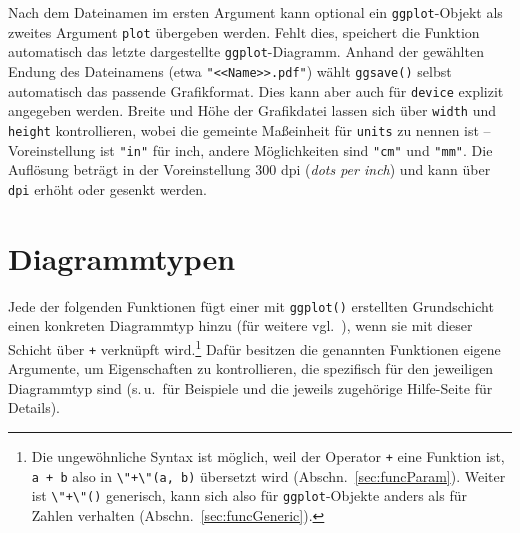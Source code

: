 Nach dem Dateinamen im ersten Argument kann optional ein \lstinline!ggplot!-Objekt als zweites Argument \lstinline!plot! übergeben werden. Fehlt dies, speichert die Funktion automatisch das letzte dargestellte \lstinline!ggplot!-Diagramm. Anhand der gewählten Endung des Dateinamens (etwa \lstinline!"<<Name>>.pdf"!) wählt \lstinline!ggsave()! selbst automatisch das passende Grafikformat. Dies kann aber auch für \lstinline!device! explizit angegeben werden. Breite und Höhe der Grafikdatei lassen sich über \lstinline!width! und \lstinline!height! kontrollieren, wobei die gemeinte Maßeinheit für \lstinline!units! zu nennen ist -- Voreinstellung ist \lstinline!"in"! für inch, andere Möglichkeiten sind \lstinline!"cm"! und \lstinline!"mm"!. Die Auflösung beträgt in der Voreinstellung 300 dpi (\emph{dots per inch}) und kann über \lstinline!dpi! erhöht oder gesenkt werden.

\section{Diagrammtypen}

Jede der folgenden Funktionen fügt einer mit \lstinline!ggplot()! erstellten Grundschicht einen konkreten Diagrammtyp hinzu (für weitere vgl.\ ), wenn sie mit dieser Schicht über \lstinline!+! verknüpft wird.\footnote{Die ungewöhnliche Syntax ist möglich, weil der Operator \lstinline!+! eine Funktion ist, \lstinline!a + b! also in \lstinline!\"+\"(a, b)! übersetzt wird (Abschn.\ \ref{sec:funcParam}). Weiter ist \lstinline!\"+\"()! generisch, kann sich also für \lstinline!ggplot!-Objekte anders als für Zahlen verhalten (Abschn.\ \ref{sec:funcGeneric}).} Dafür besitzen die genannten Funktionen eigene Argumente, um Eigenschaften zu kontrollieren, die spezifisch für den jeweiligen Diagrammtyp sind (s.\,u.\ für Beispiele und die jeweils zugehörige Hilfe-Seite für Details).

